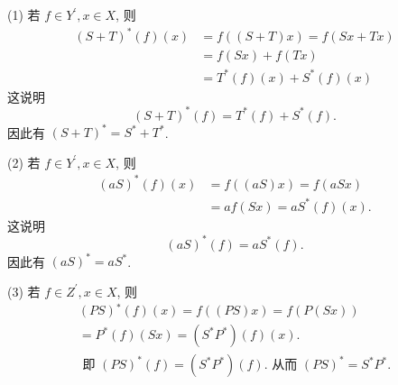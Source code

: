 \documentclass[openany]{ctexbook}
\makeatletter
\theoremstyle{kaiti}
\theoremstyle{normal}
\renewenvironment{proof}[1][\proofname]{\par
    \pushQED{\qed}%
    \normalfont \topsep6\p@\@plus6\p@\relax
    \trivlist
    \item\relax
    {\heiti #1}\hspace{2\labelsep}\ignorespaces
  }{%
    \popQED\endtrivlist\@endpefalse
  }
\makeatother
\begin{document}
\begin{proof}
(1) 若 $f \in Y^{\prime}, x \in X$, 则
$$
\begin{aligned}
(S+T)^{*}(f)(x) &=f((S+T) x)=f(S x+T x) \\
&=f(S x)+f(T x) \\
&=T^{*}(f)(x)+S^{*}(f)(x)
\end{aligned}
$$
这说明
$$
(S+T)^{*}(f)=T^{*}(f)+S^{*}(f).
$$
因此有 $(S+T)^{*}=S^{*}+T^{*}$.

(2) 若 $f \in Y^{\prime}, x \in X$, 则
$$
\begin{aligned}
(a S)^{*}(f)(x) &=f((a S) x)=f(a S x) \\
&=a f(S x)=a S^{*}(f)(x).
\end{aligned}
$$
这说明
$$
(a S)^{*}(f)=a S^{*}(f).
$$
因此有 $(a S)^{*}=a S^{*}$.

(3) 若 $f \in Z^{\prime}, x \in X$, 则
$$
\begin{gathered}
(P S){ }^{*}(f)(x)=f((P S) x)=f(P(S x)) \\
=P^{*}(f)(S x)=\left(S^{*} P^{*}\right)(f)(x). \\
\text { 即 }(P S)^{*}(f)=\left(S^{*} P^{*}\right)(f). \text { 从而 }(P S)^{*}=S^{*} P^{*}.
\end{gathered}
$$
\end{proof}
\end{document}

